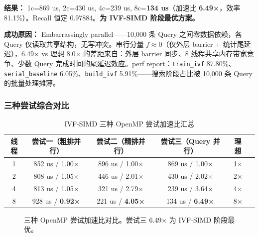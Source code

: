 \documentclass[UTF8,a4paper,10pt]{ctexart}
\begin{document}
\textbf{结果：} 1c=869 us, 2c=430 us, 4c=239 us, 8c=\textbf{134 us}（加速比 \textbf{6.49×}，效率 81.1\%）。Recall 恒定 0.97884。\textbf{为 IVF-SIMD 阶段最优方案。}

\textbf{成功原因：} Embarrassingly parallel——10,000 条 Query 之间零数据依赖，各 Query 仅读取共享结构，无写冲突。串行分量 $f \approx 0$（仅外层 barrier + 统计尾延迟），6.49× vs 理想 8.0× 的差距来自：外层 barrier 同步、8 线程共享内存带宽竞争、少数 Query 完成时间的尾延迟效应。perf report：\texttt{train\_ivf} 87.80\%、\texttt{serial\_baseline} 6.05\%、\texttt{build\_ivf} 5.91\%——搜索阶段占比被 10,000 条 Query 的批量处理摊薄。

\subsubsection{三种尝试综合对比}

\begin{table}[H]
\centering
\caption{IVF-SIMD 三种 OpenMP 尝试加速比汇总}
\begin{tabular}{cccccc}
\hline
线程 & 尝试一（粗排并行） & 尝试二（精排并行） & 尝试三（Query 并行） & 理想 \\
\hline
1 & 852 us / 1.00× & 896 us / 1.00× & 869 us / 1.00× & 1× \\
2 & 808 us / 1.05× & 446 us / 2.01× & 430 us / 2.02× & 2× \\
4 & 813 us / 1.05× & 321 us / 2.79× & 239 us / 3.64× & 4× \\
8 & 928 us / \textbf{0.92×} & 221 us / \textbf{4.05×} & 134 us / \textbf{6.49×} & 8× \\
\hline
\end{tabular}
\end{table}

\begin{figure}[H]
\centering
{}
\caption{三种 OpenMP 尝试加速比对比。尝试三 6.49× 为 IVF-SIMD 阶段最优。}
\end{figure}
\end{document}
